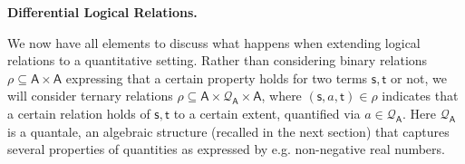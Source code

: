 \documentclass[10pt,a4paper]{amsart}
\begin{document}
 
 
 
\par\medskip\noindent\textbf{Differential Logical Relations.}\par
 
 
We now have all elements to discuss what happens when extending logical relations to a quantitative setting. Rather than considering binary relations $\rho\subseteq\mathsf{A}\times\mathsf{A}$ expressing that a certain property holds for two terms $\mathsf{s},\mathsf{t}$ or not, we will consider ternary relations $\rho\subseteq\mathsf{A}\times\mathcal{Q}_{\mathsf{A}}\times\mathsf{A}$, where $(\mathsf{s},a,\mathsf{t})\in\rho$ indicates that a certain relation holds of $\mathsf{s},\mathsf{t}$ to a certain extent, quantified via $a\in\mathcal{Q}_{\mathsf{A}}$. Here $\mathcal{Q}_{\mathsf{A}}$ is a quantale, an algebraic structure (recalled in the next section) that captures several properties of quantities as expressed by e.g. non-negative real numbers.\par
 
 
 
\end{document}
